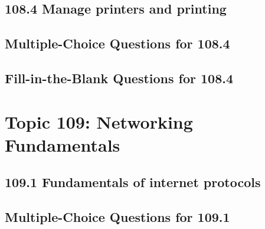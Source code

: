 \documentclass[a4paper]{report}
\begin{document}
\newpage
\section*{108.4 Manage printers and printing}

\newpage
\section*{Multiple-Choice Questions for 108.4}

\newpage
\section*{Fill-in-the-Blank Questions for 108.4}

\newpage
\chapter{Topic 109: Networking Fundamentals}

\newpage
\section*{109.1 Fundamentals of internet protocols}

\newpage
\section*{Multiple-Choice Questions for 109.1}
\end{document}
